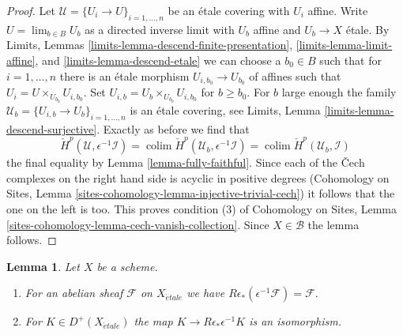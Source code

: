 \documentclass{stacks-project}
\theoremstyle{plain}
\newtheorem{lemma}[subsection]{Lemma}
\theoremstyle{definition}
\theoremstyle{remark}
\numberwithin{equation}{subsection}
\def\lim{\mathop{\mathrm{lim}}\nolimits}
\def\colim{\mathop{\mathrm{colim}}\nolimits}
\def\etale{{\acute{e}tale}}
\begin{document}
\begin{proof}
\medskip\noindent
Let $\mathcal{U} = \{U_i \to U\}_{i = 1, \ldots, n}$ be an \'etale covering
with $U_i$ affine. Write $U = \lim_{b \in B} U_b$ as a directed inverse limit
with $U_b$ affine and $U_b \to X$ \'etale.
By Limits, Lemmas \ref{limits-lemma-descend-finite-presentation},
\ref{limits-lemma-limit-affine}, and
\ref{limits-lemma-descend-etale}
we can choose a $b_0 \in B$ such that for $i = 1, \ldots, n$ there is an
\'etale morphism $U_{i, b_0} \to U_{b_0}$ of affines
such that $U_i = U \times_{U_{b_0}} U_{i, b_0}$.
Set $U_{i, b} = U_b \times_{U_{b_0}} U_{i, b_0}$ for $b \geq b_0$.
For $b$ large enough the family
$\mathcal{U}_b = \{U_{i, b} \to U_b\}_{i = 1, \ldots, n}$
is an \'etale covering, see
Limits, Lemma \ref{limits-lemma-descend-surjective}.
Exactly as before we find that
$$
\check{H}^p(\mathcal{U}, \epsilon^{-1}\mathcal{I}) =
\colim \check{H}^p(\mathcal{U}_b, \epsilon^{-1}\mathcal{I}) =
\colim \check{H}^p(\mathcal{U}_b, \mathcal{I})
$$
the final equality by Lemma \ref{lemma-fully-faithful}.
Since each of the {\v C}ech complexes on the right hand side is
acyclic in positive degrees
(Cohomology on Sites, Lemma
\ref{sites-cohomology-lemma-injective-trivial-cech})
it follows that the one on the left is too. This proves condition (3) of
Cohomology on Sites, Lemma \ref{sites-cohomology-lemma-cech-vanish-collection}.
Since $X \in \mathcal{B}$ the lemma follows.
\end{proof}

\begin{lemma}
\label{lemma-relative-comparison}
Let $X$ be a scheme.
\begin{enumerate}
\item For an abelian sheaf $\mathcal{F}$ on $X_\etale$
we have $R\epsilon_*(\epsilon^{-1}\mathcal{F}) = \mathcal{F}$.
\item For $K \in D^+(X_\etale)$ the map $K \to R\epsilon_*\epsilon^{-1}K$
is an isomorphism.
\end{enumerate}
\end{lemma}
\end{document}
